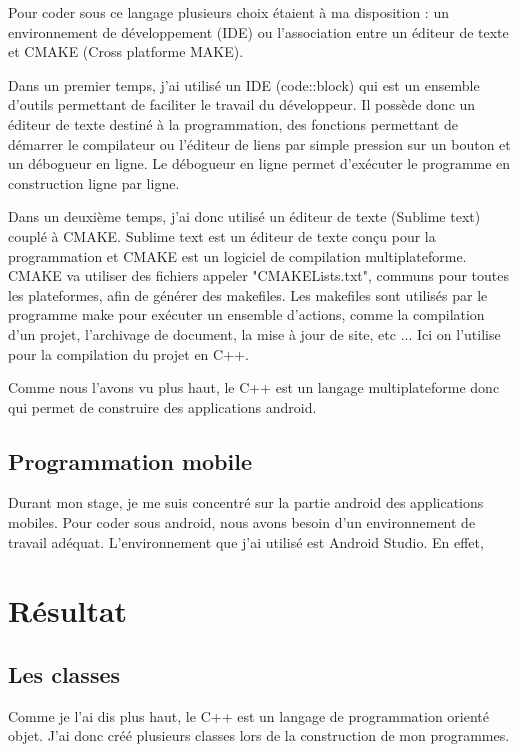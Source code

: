 \documentclass[a4paper,12pt]{article}
\begin{document}
  Pour coder sous ce langage plusieurs choix étaient à ma disposition : un environnement de développement (IDE) ou l'association entre un éditeur de texte et CMAKE (Cross platforme MAKE). 
  
  Dans un premier temps, j'ai utilisé un IDE (code::block) qui est un ensemble d'outils permettant de faciliter le travail du développeur. Il possède donc un éditeur de texte destiné à la programmation, des fonctions permettant de démarrer le compilateur ou l'éditeur de liens par simple pression sur un bouton et un débogueur en ligne. Le débogueur en ligne permet d'exécuter le programme en construction ligne par ligne. 
  
  Dans un deuxième temps, j'ai donc utilisé un éditeur de texte (Sublime text) couplé à CMAKE. Sublime text est un éditeur de texte conçu pour la programmation et CMAKE est un logiciel de compilation multiplateforme. CMAKE va utiliser des fichiers appeler "CMAKELists.txt", communs pour toutes les plateformes, afin de générer des makefiles. Les makefiles sont utilisés par le programme make pour exécuter un ensemble d'actions, comme la compilation d'un projet, l'archivage de document, la mise à jour de site, etc ... Ici on l'utilise pour la compilation du projet en C++.
  
   \vspace{0.25cm}
Comme nous l'avons vu plus haut, le C++ est un langage multiplateforme donc qui permet de construire des applications android.
	\subsection{Programmation mobile}
	Durant mon stage, je me suis concentré sur la partie android des applications mobiles. Pour coder sous android, nous avons besoin d'un environnement de travail adéquat. L'environnement que j'ai utilisé est Android Studio. En effet, 




\newpage
\section{Résultat}
	\subsection{Les classes}
Comme je l'ai dis plus haut, le C++ est un langage de programmation orienté objet. J'ai donc créé plusieurs classes lors de la construction de mon programmes.  
\end{document}
